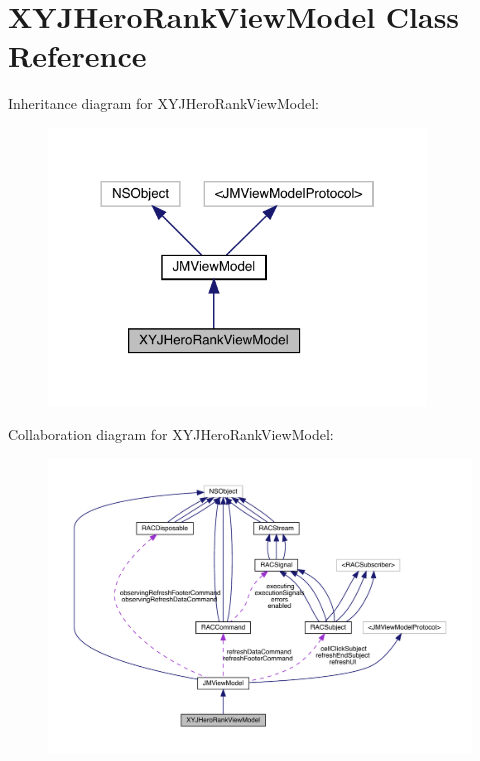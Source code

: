 \hypertarget{interface_x_y_j_hero_rank_view_model}{}\section{X\+Y\+J\+Hero\+Rank\+View\+Model Class Reference}
\label{interface_x_y_j_hero_rank_view_model}


Inheritance diagram for X\+Y\+J\+Hero\+Rank\+View\+Model\+:\nopagebreak
\begin{figure}[H]
\begin{center}
\leavevmode
\includegraphics[width=284pt]{interface_x_y_j_hero_rank_view_model__inherit__graph}
\end{center}
\end{figure}


Collaboration diagram for X\+Y\+J\+Hero\+Rank\+View\+Model\+:\nopagebreak
\begin{figure}[H]
\begin{center}
\leavevmode
\includegraphics[width=350pt]{interface_x_y_j_hero_rank_view_model__coll__graph}
\end{center}
\end{figure}
